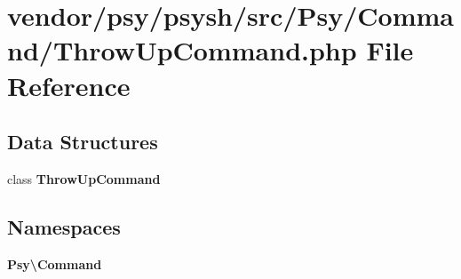 \section{vendor/psy/psysh/src/\+Psy/\+Command/\+Throw\+Up\+Command.php File Reference}
\label{_throw_up_command_8php}
\subsection*{Data Structures}
\begin{DoxyCompactItemize}
\item 
class {\bf Throw\+Up\+Command}
\end{DoxyCompactItemize}
\subsection*{Namespaces}
\begin{DoxyCompactItemize}
\item 
 {\bf Psy\textbackslash{}\+Command}
\end{DoxyCompactItemize}
